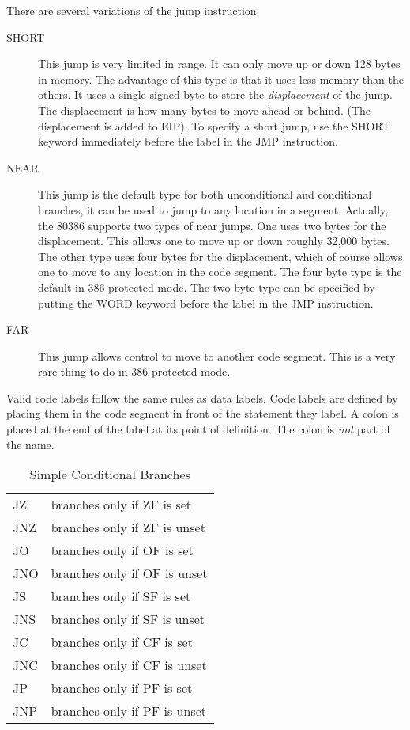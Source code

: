 There are several variations of the jump instruction:
\begin{description}

\item[SHORT] This jump is very limited in range. It can only move up or
down 128 bytes in memory. The advantage of this type is that it uses less
memory than the others. It uses a single signed byte to store the 
\emph{displacement} of the jump. The displacement is how many bytes to move 
ahead or behind. (The displacement is added to EIP). To specify a
short jump, use the {\code SHORT} keyword immediately before the label
in the {\code JMP} instruction.

\item[NEAR] This jump is the default type for both unconditional and 
conditional branches, it can be used to jump to any location in a
segment. Actually, the 80386 supports two types of near jumps.  One
uses two bytes for the displacement. This allows one to move up or
down roughly 32,000 bytes. The other type uses four bytes for the
displacement, which of course allows one to move to any location in
the code segment. The four byte type is the default in 386 protected
mode. The two byte type can be specified by putting the {\code WORD}
keyword before the label in the {\code JMP} instruction.

\item[FAR] This jump allows control to move to another code segment. This is
a very rare thing to do in 386 protected mode.
\end{description}

Valid code labels follow the same rules as data labels. Code labels
are defined by placing them in the code segment in front of the statement
they label. A colon is placed at the end of the label at its point of
definition. The colon is \emph{not} part of the name.

\begin{table}[t]
\center
\begin{tabular}{|ll|}
\hline
JZ  & branches only if ZF is set \\
JNZ & branches only if ZF is unset \\
JO  & branches only if OF is set \\
JNO & branches only if OF is unset \\
JS  & branches only if SF is set \\
JNS & branches only if SF is unset \\
JC  & branches only if CF is set \\
JNC & branches only if CF is unset \\
JP  & branches only if PF is set \\
JNP & branches only if PF is unset \\
\hline
\end{tabular}
\caption{Simple Conditional Branches \label{tab:SimpBran}  
             
         }
\end{table}

